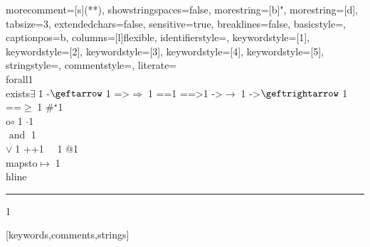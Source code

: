 {    %
    morecomment=[s]{(*}{*)},
    showstringspaces=false,
    morestring=[b]",
    morestring=[d],
    tabsize=3,
    extendedchars=false,
    sensitive=true,
    breaklines=false,
    basicstyle=\small,
    captionpos=b,
    columns=[l]flexible,
    identifierstyle={\ttfamily\color{black}},
    keywordstyle=[1]{\ttfamily\color{dkviolet}},
    keywordstyle=[2]{\ttfamily\color{dkgreen}},
    keywordstyle=[3]{\ttfamily\color{ltblue}},
    keywordstyle=[4]{\ttfamily\color{dkblue}},
    keywordstyle=[5]{\ttfamily\color{dkred}},
    stringstyle=\ttfamily,
    commentstyle={\ttfamily\color{dkgreen}},
    literate=
    {\\forall}{{\color{dkgreen}{$\forall\;$}}}1
    {\\exists}{{$\exists\;$}}1
    {\ge -}{{$\geftarrow\;$}}1
    {=>}{{$\Rightarrow\;$}}1
    {==}{{\code{==}\;}}1
    {==>}{{\code{==>}\;}}1
    {->}{{$\rightarrow\;$}}1
    {\ge ->}{{$\geftrightarrow\;$}}1
    {\ge ==}{{$\geq\;$}}1
    {\#}{{$^\star$}}1 
    {\\o}{{$\circ\;$}}1 
    {\@}{{$\cdot$}}1 
    {\/\\}{{$\text{ and }\;$}}1
    {\\\/}{{$\vee\;$}}1
    {++}{{\code{++}}}1
    {~}{{\ }}1
    {\@\@}{{$@$}}1
    {\\mapsto}{{$\mapsto\;$}}1
    {\\hline}{{\rule{\linewidth}{0.5pt}}}1
}[keywords,comments,strings]

\usepackage{amssymb,amsmath,amsthm,mathtools}
\usepackage[math-style=TeX,bold-style=TeX]{unicode-math}
\theoremstyle{definition}
\newtheorem{definition}{Definition}[section]
\newtheorem{example}{Example}[section]
\newtheorem{lem}{Lemma}[section]
\newtheorem{thm}{Theorem}[section]
\newtheorem{cor}{Corollary}[section]
\newtheorem{clm}{Claim}[section]

